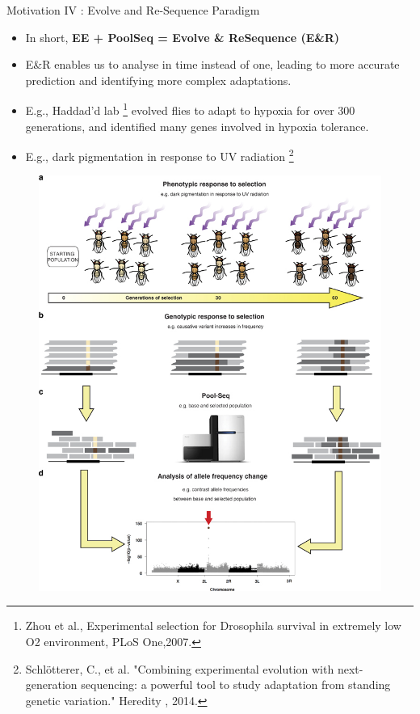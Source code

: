 \documentclass[t]{beamer} %
\begin{document}
\begin{frame}{Motivation IV : Evolve and Re-Sequence Paradigm}
\begin{itemize}
\item  In short,   {\bf EE + PoolSeq = Evolve \& ReSequence (E\&R)}
\item E\&R enables us to analyse  in time instead of one, leading to more accurate prediction and identifying more complex adaptations.
\item E.g., Haddad'd lab \footnote{\tiny Zhou et al., Experimental selection for Drosophila survival in extremely low O2 environment, PLoS One,2007.} evolved flies to adapt to hypoxia for over 300 generations, and identified many genes involved in hypoxia tolerance.
\item E.g., dark pigmentation in response to UV radiation \footnote{\tiny Schlötterer, C., et al. "Combining experimental evolution with next-generation sequencing: a powerful tool to study adaptation from standing genetic variation." Heredity , 2014.}
\end{itemize}
\end{frame}

\begin{frame}
\begin{figure}
\includegraphics[trim={0 2.1in 0 0},clip, scale=0.65]{eg.jpg} 
\end{figure}

\end{frame}
\end{document}
